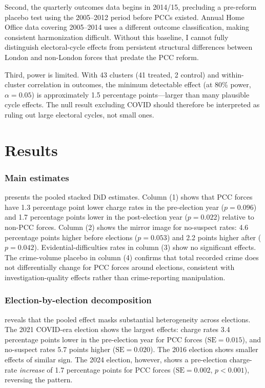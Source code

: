 \documentclass[12pt]{article}
\begin{document}
Second, the quarterly outcomes data begins in 2014/15, precluding a pre-reform placebo test using the 2005--2012 period before PCCs existed. Annual Home Office data covering 2005--2014 uses a different outcome classification, making consistent harmonization difficult. Without this baseline, I cannot fully distinguish electoral-cycle effects from persistent structural differences between London and non-London forces that predate the PCC reform.

Third, power is limited. With 43 clusters (41 treated, 2 control) and within-cluster correlation in outcomes, the minimum detectable effect (at 80\% power, $\alpha = 0.05$) is approximately 1.5 percentage points---larger than many plausible cycle effects. The null result excluding COVID should therefore be interpreted as ruling out large electoral cycles, not small ones.


\section{Results}

\subsubsection*{Main estimates}  presents the pooled stacked DiD estimates. Column (1) shows that PCC forces have 1.3 percentage point lower charge rates in the pre-election year ($p = 0.096$) and 1.7 percentage points lower in the post-election year ($p = 0.022$) relative to non-PCC forces. Column (2) shows the mirror image for no-suspect rates: 4.6 percentage points higher before elections ($p = 0.053$) and 2.2 points higher after ($p = 0.042$). Evidential-difficulties rates in column (3) show no significant effects. The crime-volume placebo in column (4) confirms that total recorded crime does not differentially change for PCC forces around elections, consistent with investigation-quality effects rather than crime-reporting manipulation.



\subsubsection*{Election-by-election decomposition}  reveals that the pooled effect masks substantial heterogeneity across elections. The 2021 COVID-era election shows the largest effects: charge rates 3.4 percentage points lower in the pre-election year for PCC forces ($\text{SE} = 0.015$), and no-suspect rates 5.7 points higher ($\text{SE} = 0.020$). The 2016 election shows smaller effects of similar sign. The 2024 election, however, shows a pre-election charge-rate \textit{increase} of 1.7 percentage points for PCC forces ($\text{SE} = 0.002$, $p < 0.001$), reversing the pattern.
\end{document}
